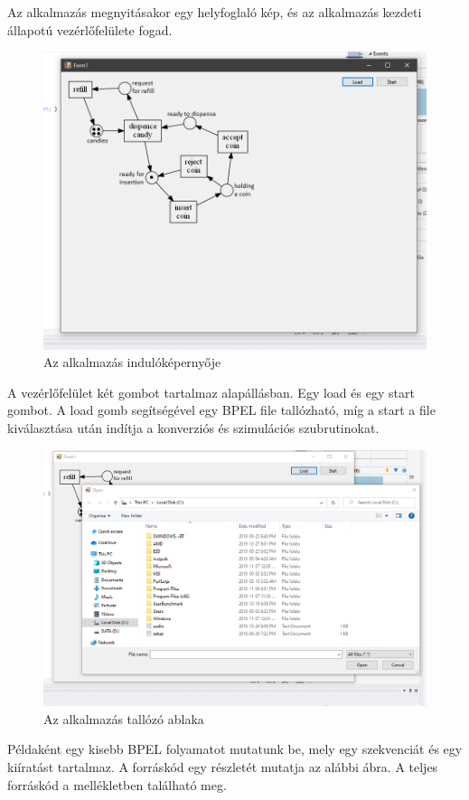 Az alkalmazás megnyitásakor egy helyfoglaló kép, és az alkalmazás kezdeti állapotú vezérlőfelülete fogad. 
\begin{figure}[h!]
\centering
\includegraphics[scale=0.5]{images/UIlayout.png}
\caption{Az alkalmazás indulóképernyője}
\label{fig:flow}
\end{figure}
A vezérlőfelület két gombot tartalmaz alapállásban. Egy load és egy start gombot. A load gomb segítségével egy BPEL file tallózható, míg a start a file kiválasztása  után indítja a konverziós és szimulációs szubrutinokat. 
\begin{figure}[h!]
\centering
\includegraphics[scale=0.5]{images/fileDialog.png}
\caption{Az alkalmazás tallózó ablaka}
\end{figure}
Példaként egy kisebb BPEL folyamatot mutatunk be, mely egy szekvenciát és egy kiíratást tartalmaz. A forráskód egy részletét mutatja az alábbi ábra. A teljes forráskód a mellékletben található meg.
